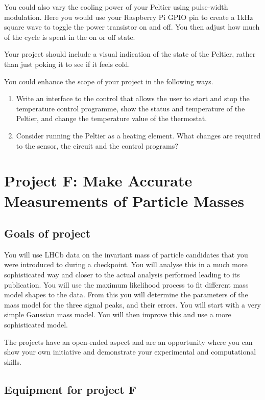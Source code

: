You could also vary the cooling power of your Peltier using pulse-width modulation. Here you would use your Raspberry Pi GPIO pin to create a 1kHz square wave to toggle the power transistor on and off. You then adjust how much of the cycle is spent in the on or off state.


Your project should include a visual indication of the state of the Peltier, rather than just poking it to see if it feels cold. 


You could enhance the scope of your project in the following ways.
\begin{enumerate}
\item Write an interface to the control that allows the user to start and stop the temperature control programme, show the status and temperature of the Peltier, and change the temperature value of the thermostat.
\item Consider running the Peltier as a heating element. What changes are required to the sensor, the circuit and the control programs?
\end{enumerate}


 
 
 
\newpage
\section{Project F: Make Accurate Measurements of Particle Masses}

\subsection{Goals of project}

You will use LHCb data on the invariant mass of particle candidates that you were introduced to during a checkpoint. You will analyse this in a much more sophisticated way and closer to the actual analysis performed leading to its publication. You will use the maximum likelihood process to fit different mass model shapes to the data. From this you will determine the parameters of the mass model for the three signal peaks, and their errors. You will start with a very simple Gaussian mass model. You will then improve this and use a more sophisticated model.

The projects have an open-ended aspect and are an opportunity where you can show your own initiative and demonstrate your experimental and computational skills. 

\subsection{Equipment for project F}

